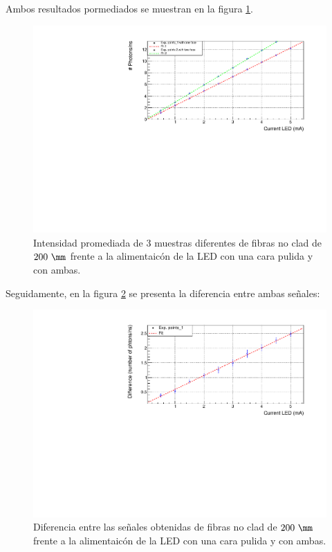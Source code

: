 Ambos resultados pormediados se muestran en la figura \ref{resultadoscaras}.

\begin{figure}[hbtp]
\centering
\includegraphics[scale=0.7]{Figuras/casefaces.pdf}
\caption{Intensidad promediada de 3 muestras diferentes de fibras no clad de $200~\mm$ frente a la alimentaicón de la LED con una cara pulida y con ambas.\label{resultadoscaras}}
\end{figure}

Seguidamente, en la figura \ref{diferenciacaras} se presenta la diferencia entre ambas señales:

\begin{figure}[hbtp]
\centering
\includegraphics[scale=0.7]{Figuras/Differencefaces.pdf}
\caption{Diferencia entre las señales obtenidas de fibras no clad de $200~\mm$ frente a la alimentaicón de la LED con una cara pulida y con ambas.\label{diferenciacaras}}
\end{figure}

